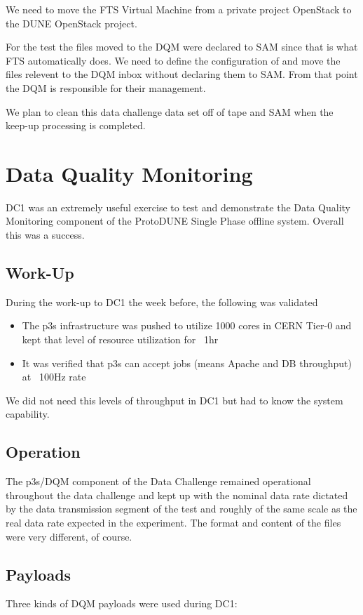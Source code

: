 \documentclass[pdftex,12pt,letter]{article}
\begin{document}
We need to move the FTS Virtual Machine from a private project OpenStack to the  DUNE OpenStack project. 

For the test the files moved to the DQM were declared to SAM since that is what FTS automatically does. We need to define the configuration of and move the files relevent to the DQM inbox without declaring them to SAM. From that point the DQM is responsible for their management.

We plan to clean this data challenge data set off of tape and SAM when the keep-up processing is completed.


\section {Data Quality Monitoring}
DC1 was an extremely useful exercise to test and demonstrate the Data Quality Monitoring component of the ProtoDUNE Single Phase offline system. Overall this was a success.

\subsection{Work-Up}

During the work-up to DC1 the week before, the following was validated
\begin{itemize}
\item The p3s infrastructure was pushed to utilize 1000 cores in CERN Tier-0 and kept that level of resource utilization for ~1hr
\item It was verified that p3s can accept jobs (means Apache and DB throughput) at ~100Hz rate
\end{itemize}

We did not need this levels of throughput in DC1 but had to know the system capability.

\subsection{Operation}
The p3s/DQM component of the Data Challenge remained operational throughout the data challenge  and kept up with the nominal data rate dictated by the data transmission segment of the test and roughly of the same scale as the real data rate expected in the experiment. The format and content of the files were very different, of course.
\subsection{Payloads}
Three kinds of DQM payloads were used during DC1:
\end{document}

